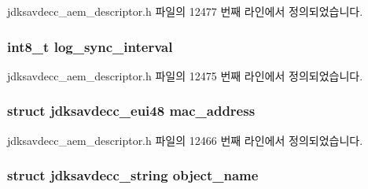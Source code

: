 jdksavdecc\+\_\+aem\+\_\+descriptor.\+h 파일의 12477 번째 라인에서 정의되었습니다.

\subsubsection[{\texorpdfstring{log\+\_\+sync\+\_\+interval}{log_sync_interval}}]{\setlength{\rightskip}{0pt plus 5cm}int8\+\_\+t log\+\_\+sync\+\_\+interval}\hypertarget{structjdksavdecc__descriptor__avb__interface_a2d4950b4c6da4dfa67688dcaf6139c9d}{}\label{structjdksavdecc__descriptor__avb__interface_a2d4950b4c6da4dfa67688dcaf6139c9d}


jdksavdecc\+\_\+aem\+\_\+descriptor.\+h 파일의 12475 번째 라인에서 정의되었습니다.

\subsubsection[{\texorpdfstring{mac\+\_\+address}{mac_address}}]{\setlength{\rightskip}{0pt plus 5cm}struct {\bf jdksavdecc\+\_\+eui48} mac\+\_\+address}\hypertarget{structjdksavdecc__descriptor__avb__interface_a335a1976f38f9eb92655c394f62bea82}{}\label{structjdksavdecc__descriptor__avb__interface_a335a1976f38f9eb92655c394f62bea82}


jdksavdecc\+\_\+aem\+\_\+descriptor.\+h 파일의 12466 번째 라인에서 정의되었습니다.

\subsubsection[{\texorpdfstring{object\+\_\+name}{object_name}}]{\setlength{\rightskip}{0pt plus 5cm}struct {\bf jdksavdecc\+\_\+string} object\+\_\+name}\hypertarget{structjdksavdecc__descriptor__avb__interface_a7d1f5945a13863b1762fc6db74fa8f80}{}\label{structjdksavdecc__descriptor__avb__interface_a7d1f5945a13863b1762fc6db74fa8f80}


